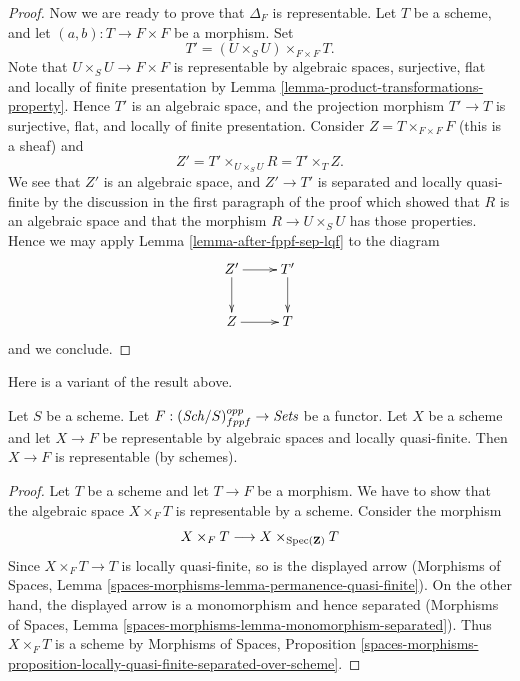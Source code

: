 \begin{proof}
\medskip\noindent
Now we are ready to prove that $\Delta_F$ is representable.
Let $T$ be a scheme, and let $(a, b) : T \to F \times F$ be a morphism.
Set
$$
T' = (U \times_S U) \times_{F \times F} T.
$$
Note that $U \times_S U \to F \times F$ is
representable by algebraic spaces, surjective, flat and
locally of finite presentation by
Lemma \ref{lemma-product-transformations-property}.
Hence $T'$ is an algebraic space, and the projection morphism
$T' \to T$ is surjective, flat, and locally of finite presentation.
Consider $Z = T \times_{F \times F} F$ (this is a sheaf) and
$$
Z' = T' \times_{U \times_S U} R
= T' \times_T Z.
$$
We see that $Z'$ is an algebraic space, and
$Z' \to T'$ is separated and locally quasi-finite by the
discussion in the first paragraph of the proof which showed that $R$ is
an algebraic space and that the
morphism $R \to U \times_S U$ has those properties.
Hence we may apply
Lemma \ref{lemma-after-fppf-sep-lqf}
to the diagram
$$
\xymatrix{
Z' \ar[r] \ar[d] & T' \ar[d] \\
Z \ar[r] & T
}
$$
and we conclude.
\end{proof}

\noindent
Here is a variant of the result above.

\begin{lemma}
\label{lemma-bootstrap-locally-quasi-finite}
Let $S$ be a scheme. Let $F : (\mathit{Sch}/S)_{fppf}^{opp} \to \textit{Sets}$ be a
functor. Let $X$ be a scheme and let $X \to F$ be representable by algebraic
spaces and locally quasi-finite. Then $X \to F$ is representable
(by schemes).
\end{lemma}

\begin{proof}
Let $T$ be a scheme and let $T \to F$ be a morphism. We have to show that
the algebraic space $X \times_F T$ is representable by a scheme. Consider
the morphism
$$
X \times_F T  \longrightarrow X \times_{\mathop{\mathrm{Spec}}(\mathbf{Z})} T
$$
Since $X \times_F T \to T$ is locally quasi-finite, so is the displayed
arrow (Morphisms of Spaces, Lemma
\ref{spaces-morphisms-lemma-permanence-quasi-finite}).
On the other hand, the displayed arrow is a monomorphism
and hence separated (Morphisms of Spaces, Lemma
\ref{spaces-morphisms-lemma-monomorphism-separated}).
Thus $X \times_F T$ is a scheme by Morphisms of Spaces, Proposition
\ref{spaces-morphisms-proposition-locally-quasi-finite-separated-over-scheme}.
\end{proof}











